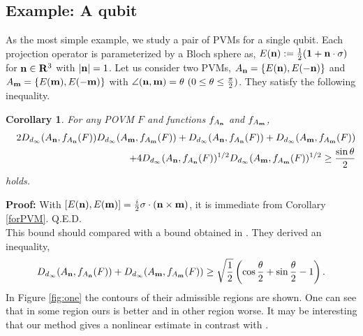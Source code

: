 \documentclass[showpacs,preprintnumbers,amsmath,amssymb]{revtex4}
\newtheorem{corollary}{Corollary}
\begin{document}
\subsection{Example: A qubit}
As the most simple example, we study a pair of 
PVMs for a single qubit. 
Each projection operator is parameterized by a Bloch sphere as, 
$E({\bf n}):=\frac{1}{2}({\bf 1}+{\bf n}\cdot {\bf \sigma})$
for ${\bf n}\in {\bf R}^3$ with $|{\bf n}|=1$. 
Let us consider two PVMs, 
$A_{\bf n}=\{E({\bf n}),E(-{\bf n})\}$ and 
$A_{\bf m}=\{E({\bf m}), E(-{\bf m})\}$ with 
$\angle({\bf n},{\bf m})=\theta \ (0\leq \theta \leq \frac{\pi}{2})$. 
They satisfy the following inequality. 
\begin{corollary}
For any POVM $F$ and functions $f_{A_{\bf n}}$ and $f_{A_{\bf m}}$, 
\begin{eqnarray*}
&&2 D_{d_{\infty}}(A_{\bf n}, f_{A_{\bf n}}(F))
D_{d_{\infty}}(A_{\bf m}, f_{A_{\bf m}}(F))
+D_{d_{\infty}}(A_{\bf n},f_{A_{\bf n}}(F))
+D_{d_{\infty}}(A_{\bf m},f_{A_{\bf m}}(F))
\\
&&
+4 D_{d_{\infty}}(A_{\bf n},f_{A_{\bf n}}(F))^{1/2}
D_{d_{\infty}}(A_{\bf m},f_{A_{\bf m}}(F))^{1/2}
\geq \frac{\sin \theta}{2}
\end{eqnarray*}
holds. 
\end{corollary}
{\bf Proof:}
With $[E({\bf n}), E({\bf m})]=\frac{i}{2}{\bf \sigma}\cdot 
({\bf n} \times {\bf m})$, it is immediate from Corollary \ref{forPVM}. 
\hfill Q.E.D.
\\
This bound should compared with a bound obtained in 
\cite{Heinosaari}. 
They derived an inequality,
\begin{eqnarray}
D_{d_{\infty}}(A_{\bf n},f_{A_{\bf n}}(F))
+D_{d_{\infty}}(A_{\bf m},f_{A_{\bf m}}(F))
\geq \sqrt{\frac{1}{2}}
\left(\cos \frac{\theta}{2}+\sin \frac{\theta}{2}
-1
\right). 
\label{eqHeino}
\end{eqnarray}
In Figure \ref{fig:one} the contours 
of their admissible regions 
are shown. One can see that in some region ours is 
better and in other region worse. It may be interesting 
that our method gives a nonlinear estimate in contrast with 
\cite{Heinosaari}.
\end{document}
